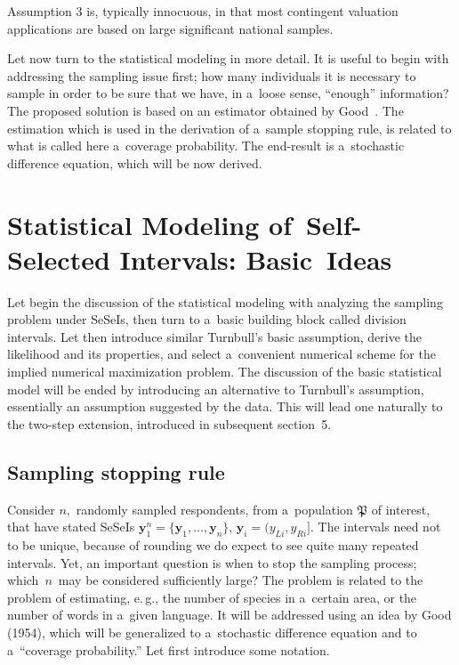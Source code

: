 \begin{multicols}{2}
 Assumption 3 is, typically innocuous, in
that most contingent valuation applications are based on large
significant national samples.

Let now turn to the statistical modeling in more detail. It is useful to begin with addressing
the sampling issue first; how many individuals it is necessary to sample 
in order to be sure that
we have, in a~loose sense, ``enough'' information? The proposed solution is based on an estimator obtained
by Good~\cite{BK:GO54}. The estimation which is used in the derivation of a~sample stopping rule, is related to what
is called here a~coverage probability. The end-result is a~stochastic difference equation, which 
will be now derived.

\section{Statistical Modeling of~Self-Selected Intervals: 
Basic~Ideas} %

\noindent
Let begin the discussion of the statistical modeling with analyzing the sampling problem under SeSeIs,
then turn to a~basic building block called division intervals. Let then introduce similar Turnbull's basic assumption,
derive the likelihood and its properties, and select a~convenient numerical scheme for the implied numerical
maximization problem. The discussion of the basic statistical model 
will be ended by introducing an alternative
to Turnbull's assumption, essentially an assumption suggested by the data. This will lead one naturally to
the two-step extension, introduced in subsequent section~5.
{

}

\subsection{Sampling stopping rule}

\vspace*{-2pt}

\noindent
Consider $n,$ randomly sampled respondents, from  
a~population $\mathfrak{P}$ of interest,
  that have stated SeSeIs $\mathbf{y}_1^n =\{ \mathbf{y}_1, \ldots , \mathbf{y}_n\}$, 
  $ \mathbf{y}_i =(y_{Li}, y_{Ri}].$
  The intervals need not to be unique, because of rounding we do expect to see quite many repeated intervals.
  Yet, an important question is when to stop the sampling process;   which~$n$~may be considered sufficiently
  large? The problem is related to the problem of estimating, e.\,g., the number of species in a~certain area,
  or the number of words in a~given language. It will be addressed using an idea by 
  Good (1954), which   will be generalized
  to a~stochastic difference equation and to a~``coverage probability.'' 
Let first introduce some notation.


\end{multicols}
